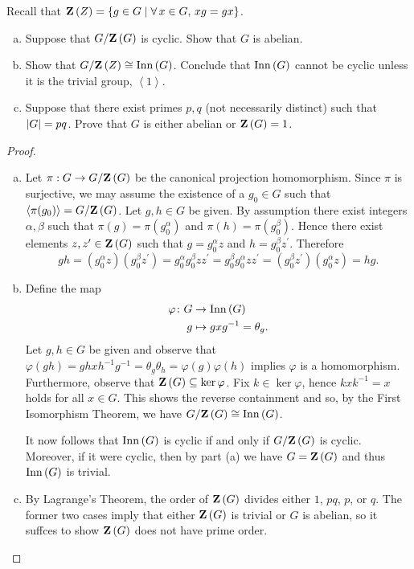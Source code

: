 \documentclass[10pt]{amsart}
\begin{document}
\begin{thm}
  Recall that $\mathbf{Z}\left(Z\right) = \left\{ g \in G \mid \forall\, x \in G, \, xg = gx \right\}$.
  \begin{enumerate}[(a)]
	\item
		Suppose that $G/\mathbf{Z}\left(G\right)$ is cyclic.  Show that $G$ is abelian.
	\item
		Show that $G/\mathbf{Z}\left(Z\right) \cong \operatorname{Inn}\left(G\right)$.  Conclude that $\operatorname{Inn}\left(G\right)$ cannot be cyclic unless it is the trivial group, $\left<1\right>$.
	\item
		Suppose that there exist primes $p,q$ (not necessarily distinct) such that $\left| G \right| = pq$.
		Prove that $G$ is either abelian or $\mathbf{Z}\left(G\right) = 1$.
  \end{enumerate}
  \begin{proof}
	\begin{enumerate}[(a)]
		\item
			Let $\pi: G \rightarrow G/\mathbf{Z}\left(G\right)$ be the canonical projection homomorphism.
			Since $\pi$ is surjective, we may assume the existence of a $g_0 \in G$ such that $\left< \pi(g_0) \right> = G/\mathbf{Z}\left(G\right)$.
			Let $g,h \in G$ be given.
			By assumption there exist integers $\alpha, \beta$ such that $\pi(g) = \pi(g_0^{\alpha})$ and $\pi(h) = \pi(g_0^{\beta})$.
			Hence there exist elements $z, z^{\prime} \in \mathbf{Z}\left(G\right)$ such that $g = g_0^{\alpha}z$ and $h = g_0^{\beta}z^{\prime}$.
			Therefore
				$$gh = (g_0^{\alpha}z)(g_0^{\beta}z^{\prime})
					= g_0^{\alpha}g_0^{\beta}zz^{\prime}
					= g_0^{\beta}g_0^{\alpha}zz^{\prime}
					= (g_0^{\beta}z^{\prime})(g_0^{\alpha}z)
					= hg.$$
		\item
			Define the map
				\begin{align*}
					\varphi \colon G &\rightarrow \operatorname{Inn}\left(G\right)\\
					g & \mapsto gxg^{-1} = \theta_g.
				\end{align*}
			Let $g,h \in G$ be given and observe that $\varphi(gh) = ghxh^{-1}g^{-1} = \theta_g\theta_h = \varphi(g)\varphi(h)$ implies $\varphi$ is a homomorphism.
			Furthermore, observe that $\mathbf{Z}\left(G\right) \subseteq \ker \varphi$.
			Fix $k \in \ker\varphi$, hence $kxk^{-1} = x$ holds for all $x \in G$.
			This shows the reverse containment and so, by the First Isomorphism Theorem, we have $G/\mathbf{Z}\left(G\right) \cong \operatorname{Inn}\left(G\right)$.
			
			It now follows that $\operatorname{Inn}\left(G\right)$ is cyclic if and only if $G/\mathbf{Z}\left(G\right)$ is cyclic.
			Moreover, if it were cyclic, then by part (a) we have $G = \mathbf{Z}\left(G\right)$ and thus $\operatorname{Inn}\left(G\right)$ is trivial.
		\item
			By Lagrange's Theorem, the order of $\mathbf{Z}\left(G\right)$ divides either $1$, $pq$, $p$, or $q$.
			The former two cases imply that either $\mathbf{Z}\left(G\right)$ is trivial or $G$ is abelian, so it suffces to show $\mathbf{Z}\left(G\right)$ does not have prime order.
			

\end{enumerate}
\end{proof}
\end{thm}
\end{document}
